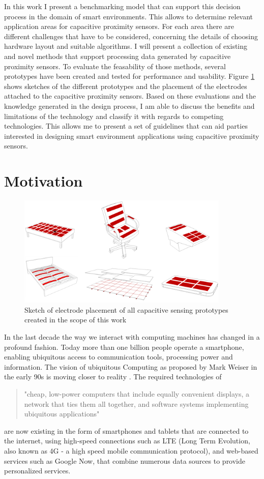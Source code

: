 In this work I present a benchmarking model that can support this decision process in the domain of smart environments. This allows to determine relevant application areas for capacitive proximity sensors. For each area there are different challenges that have to be considered, concerning the details of choosing hardware layout and suitable algorithms. I will present a collection of existing and novel methods that support processing data generated by capacitive proximity sensors. To evaluate the feasability of those methods, several prototypes have been created and tested for performance and usability. Figure \ref{fig:all_protos} shows sketches of the different prototypes and the placement of the electrodes attached to the capacitive proximity sensors. Based on these evaluations and the knowledge generated in the design process, I am able to discuss the benefits and limitations of the technology and classify it with regards to competing technologies. This allows me to present a set of guidelines that can aid parties interested in designing smart environment applications using capacitive proximity sensors.
 
\section{Motivation}
\begin{figure}[h]
\centering
\includegraphics[width=0.9\textwidth]{images/all_protos}
\caption{Sketch of electrode placement of all capacitive sensing prototypes created in the scope of this work}
\label{fig:all_protos}
\end{figure}
In the last decade the way we interact with computing machines has changed in a profound fashion. Today more than one billion people operate a smartphone, enabling ubiquitous access to communication tools, processing power and information. The vision of ubiquitous Computing as proposed by Mark Weiser in the early 90s is moving closer to reality \cite{Weiser1991}. The required technologies of \begin{quote}
"cheap, low-power computers that include equally convenient displays, a network that ties them all together, and software systems implementing ubiquitous applications" 
\end{quote}
are now existing in the form of smartphones and tablets that are connected to the internet, using high-speed connections such as LTE (Long Term Evolution, also known as 4G - a high speed mobile communication protocol), and web-based services such as Google Now, that combine numerous data sources to provide personalized services.

